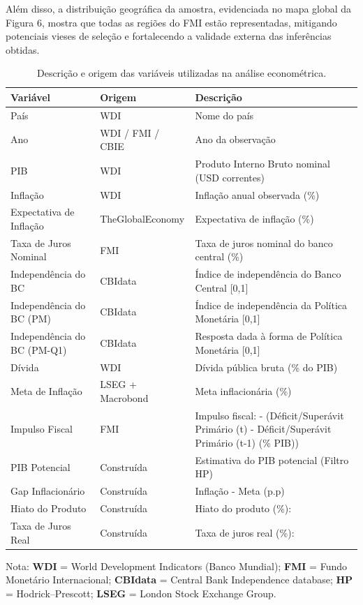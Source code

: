 \documentclass[a4paper,12pt]{article}
\begin{document}
Além disso, a distribuição geográfica da amostra, evidenciada no mapa global da Figura 6, mostra que todas as regiões do FMI estão representadas, mitigando potenciais vieses de seleção e fortalecendo a validade externa das inferências obtidas. 

\begin{table}[H]
\centering
\caption{Descrição e origem das variáveis utilizadas na análise econométrica.}
\renewcommand{\arraystretch}{1.3}
\setlength{\tabcolsep}{4pt}
\small
\begin{tabular}{>{\normalfont}l>{\normalfont}l>{\normalfont}p{7cm}}
\toprule
\rowcolor[HTML]{F2F5F9}
\textbf{Variável} & \textbf{Origem} & \textbf{Descrição} \\
\midrule
País & WDI & Nome do país \\
\rowcolor[HTML]{F9FBFD}
Ano & WDI / FMI / CBIE & Ano da observação \\
PIB & WDI & Produto Interno Bruto nominal (USD correntes) \\
\rowcolor[HTML]{F9FBFD}
Inflação & WDI & Inflação anual observada (\%) \\
Expectativa de Inflação & TheGlobalEconomy & Expectativa de inflação (\%) \\
\rowcolor[HTML]{F9FBFD}
Taxa de Juros Nominal & FMI & Taxa de juros nominal do banco central (\%) \\
Independência do BC & CBIdata & Índice de independência do Banco Central [0,1] \\
\rowcolor[HTML]{F9FBFD}
Independência do BC (PM) & CBIdata & Índice de independência da Política Monetária [0,1] \\
Independência do BC (PM-Q1) & CBIdata & Resposta dada à forma de Política Monetária [0,1] \\
\rowcolor[HTML]{F9FBFD}
Dívida & WDI & Dívida pública bruta (\% do PIB) \\
Meta de Inflação & LSEG + Macrobond & Meta inflacionária (\%) \\
\rowcolor[HTML]{F9FBFD}
Impulso Fiscal & FMI & Impulso fiscal: - (Déficit/Superávit Primário (t) - Déficit/Superávit Primário (t-1) (\% PIB)) \\
\rowcolor[HTML]{F9FBFD}
PIB Potencial & Construída & Estimativa do PIB potencial (Filtro HP) \\
Gap Inflacionário & Construída & Inflação - Meta (p.p) \\
\rowcolor[HTML]{F9FBFD}
Hiato do Produto & Construída & Hiato do produto (\%): \\
Taxa de Juros Real & Construída & Taxa de juros real (\%): \\
\bottomrule
\end{tabular}
\label{tab:base_dados}
\vspace{.1cm}
\footnotesize{
Nota: \textbf{WDI} = World Development Indicators (Banco Mundial); 
\textbf{FMI} = Fundo Monetário Internacional; 
\textbf{CBIdata} = Central Bank Independence database; 
\textbf{HP} = Hodrick–Prescott; 
\textbf{LSEG} = London Stock Exchange Group.
}
\end{table}
\end{document}
